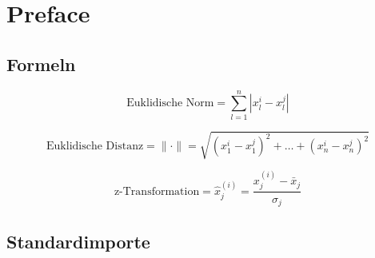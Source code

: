 
\section{Preface}

\subsection{Formeln}

\begin{equation}
    \text{Euklidische Norm} = \sum_{l=1}^{n}|x^i_l-x^j_l|
\end{equation}

\begin{equation}
    \text{Euklidische Distanz} = \|\cdot \|=\sqrt{(x^i_1-x^j_1)^2+\dots +(x^i_n-x^j_n)^2}
\end{equation}

\begin{equation}
    \text{z-Transformation} = \hat{x}^{(i)}_j = \frac{x^{(i)}_j-\bar{x}_j}{\sigma_j}
\end{equation}

\subsection{Standardimporte}
